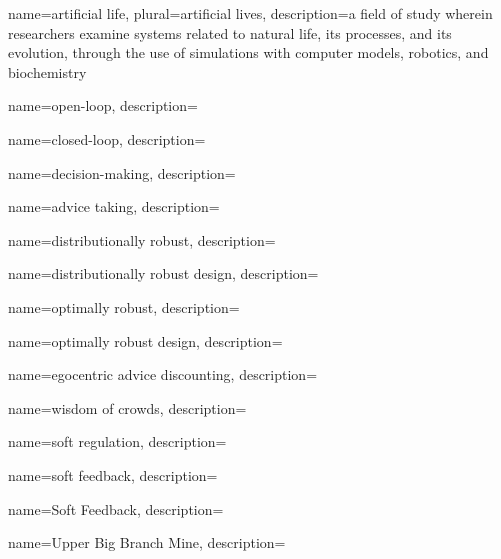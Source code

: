 

	{
		name={artificial life},
		plural={artificial lives},
		description={a field of study wherein researchers examine systems related to natural life, its processes, and its evolution, through the use of simulations with computer models, robotics, and biochemistry}
	}

	{
		name={open-loop},
		description={}
	}

	{
		name={closed-loop},
		description={}
	}	
	
	{
		name={decision-making},
		description={}
	}

	{
		name={advice taking},
		description={}
	}	
	
	{
		name={distributionally robust},
		description={}
	}
	
	{
		name={distributionally robust design},
		description={}
	}	

	{
		name={optimally robust},
		description={}
	}

	{
		name={optimally robust design},
		description={}
	}

	{
		name={egocentric advice discounting},
		description={}
	}
	
	{
		name={wisdom of crowds},
		description={}
	}

	{
		name={soft regulation},
		description={}
	}

	{
		name={soft feedback},
		description={}
	}

	{
		name={Soft Feedback},
		description={}
	}	

	
	{
		name={Upper Big Branch Mine},
		description={}
	}

